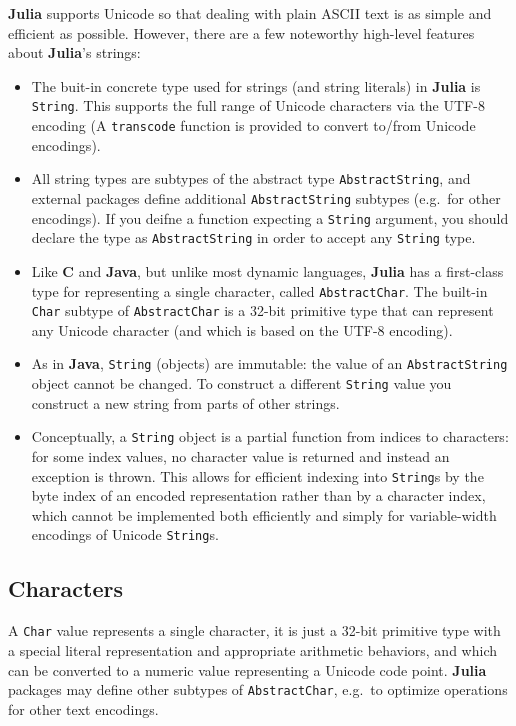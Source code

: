 \documentclass[
]{article}
\providecommand{\tightlist}{%
  \setlength{\itemsep}{0pt}\setlength{\parskip}{0pt}}
\begin{document}
\textbf{Julia} supports Unicode so that dealing with plain ASCII text is
as simple and efficient as possible. However, there are a few noteworthy
high-level features about \textbf{Julia}'s strings:

\begin{itemize}
\tightlist
\item
  The buit-in concrete type used for strings (and string literals) in
  \textbf{Julia} is \texttt{String}. This supports the full range of
  Unicode characters via the UTF-8 encoding (A \texttt{transcode}
  function is provided to convert to/from Unicode encodings).
\item
  All string types are subtypes of the abstract type
  \texttt{AbstractString}, and external packages define additional
  \texttt{AbstractString} subtypes (e.g.~for other encodings). If you
  deifne a function expecting a \texttt{String} argument, you should
  declare the type as \texttt{AbstractString} in order to accept any
  \texttt{String} type.
\item
  Like \textbf{C} and \textbf{Java}, but unlike most dynamic languages,
  \textbf{Julia} has a first-class type for representing a single
  character, called \texttt{AbstractChar}. The built-in \texttt{Char}
  subtype of \texttt{AbstractChar} is a 32-bit primitive type that can
  represent any Unicode character (and which is based on the UTF-8
  encoding).
\item
  As in \textbf{Java}, \texttt{String} (objects) are immutable: the
  value of an \texttt{AbstractString} object cannot be changed. To
  construct a different \texttt{String} value you construct a new string
  from parts of other strings.
\item
  Conceptually, a \texttt{String} object is a partial function from
  indices to characters: for some index values, no character value is
  returned and instead an exception is thrown. This allows for efficient
  indexing into \texttt{String}s by the byte index of an encoded
  representation rather than by a character index, which cannot be
  implemented both efficiently and simply for variable-width encodings
  of Unicode \texttt{String}s.
\end{itemize}

\hypertarget{characters}{%
\subsection{Characters}\label{characters}}

A \texttt{Char} value represents a single character, it is just a 32-bit
primitive type with a special literal representation and appropriate
arithmetic behaviors, and which can be converted to a numeric value
representing a Unicode code point. \textbf{Julia} packages may define
other subtypes of \texttt{AbstractChar}, e.g.~to optimize operations for
other text encodings.
\end{document}
